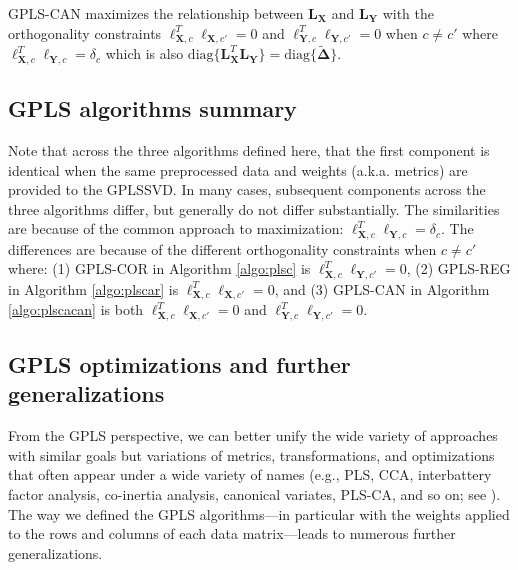 \documentclass[12pt]{article}
\begin{document}
GPLS-CAN maximizes the relationship between \({\mathbf L}_{\mathbf X}\)
and \({\mathbf L}_{\mathbf Y}\) with the orthogonality constraints
\({\boldsymbol \ell}_{{\mathbf X},c}^{T}{\boldsymbol \ell}_{{\mathbf X},c'} = 0\)
and
\({\boldsymbol \ell}_{{\mathbf Y},c}^{T}{\boldsymbol \ell}_{{\mathbf Y},c'} = 0\)
when \(c \neq c'\) where
\({\boldsymbol \ell}_{{\mathbf X},c}^{T}{\boldsymbol \ell}_{{\mathbf Y},c} = \delta_{c}\)
which is also
\(\mathrm{diag\{}{\mathbf L}_{\mathbf X}^{T}{\mathbf L}_{\mathbf Y}\mathrm{\}} = \mathrm{diag\{}\widetilde{\boldsymbol \Delta}\mathrm{\}}\).

\hypertarget{gpls-algorithms-summary}{%
\subsection{GPLS algorithms summary}\label{gpls-algorithms-summary}}

Note that across the three algorithms defined here, that the first
component is identical when the same preprocessed data and weights
(a.k.a. metrics) are provided to the GPLSSVD. In many cases, subsequent
components across the three algorithms differ, but generally do not
differ substantially. The similarities are because of the common
approach to maximization:
\({\boldsymbol \ell}_{{\mathbf X},c}^{T}{\boldsymbol \ell}_{{\mathbf Y},c} = \delta_{c}\).
The differences are because of the different orthogonality constraints
when \(c \neq c'\) where: (1) GPLS-COR in Algorithm \ref{algo:plsc} is
\({\boldsymbol \ell}_{{\mathbf X},c}^{T}{\boldsymbol \ell}_{{\mathbf Y},c'} = 0\),
(2) GPLS-REG in Algorithm \ref{algo:plscar} is
\({\boldsymbol \ell}_{{\mathbf X},c}^{T}{\boldsymbol \ell}_{{\mathbf X},c'} = 0\),
and (3) GPLS-CAN in Algorithm \ref{algo:plscacan} is both
\({\boldsymbol \ell}_{{\mathbf X},c}^{T}{\boldsymbol \ell}_{{\mathbf X},c'} = 0\)
and
\({\boldsymbol \ell}_{{\mathbf Y},c}^{T}{\boldsymbol \ell}_{{\mathbf Y},c'} = 0\).

\hypertarget{gpls-optimizations-and-further-generalizations}{%
\subsection{GPLS optimizations and further
generalizations}\label{gpls-optimizations-and-further-generalizations}}

From the GPLS perspective, we can better unify the wide variety of
approaches with similar goals but variations of metrics,
transformations, and optimizations that often appear under a wide
variety of names (e.g., PLS, CCA, interbattery factor analysis,
co-inertia analysis, canonical variates, PLS-CA, and so on; see
\citet{abdi2017canonical}). The way we defined the GPLS algorithms---in
particular with the weights applied to the rows and columns of each data
matrix---leads to numerous further generalizations.
\end{document}
